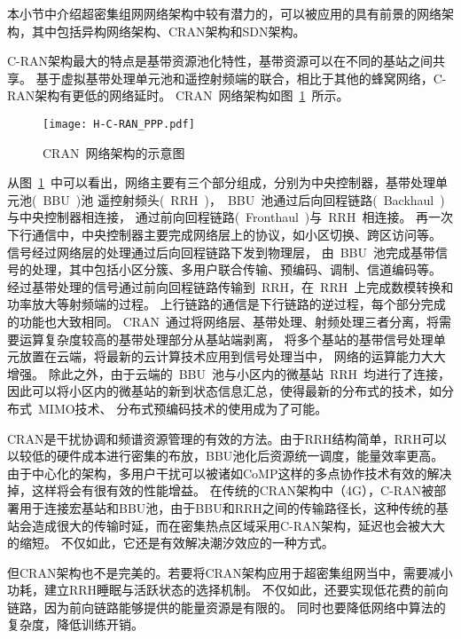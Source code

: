 本小节中介绍超密集组网网络架构中较有潜力的，可以被应用的具有前景的网络架构，其中包括异构网络架构、CRAN架构和SDN架构。

C-RAN架构最大的特点是基带资源池化特性，基带资源可以在不同的基站之间共享。
基于虚拟基带处理单元池和遥控射频端的联合，相比于其他的蜂窝网络，C-RAN架构有更低的网络延时。
CRAN~网络架构如图~\ref{CRAN}~所示。
\begin{figure}[htbp]
\centering
\texttt{[image: H-C-RAN\_PPP.pdf]}
\caption{CRAN~网络架构的示意图}\vspace{-1.5em}
\label{CRAN}
\end{figure}
从图~\ref{CRAN}~中可以看出，网络主要有三个部分组成，分别为中央控制器，基带处理单元池(~BBU~)池
遥控射频头(~RRH~)，~BBU~池通过后向回程链路(~Backhaul~)与中央控制器相连接，
通过前向回程链路(~Fronthaul~)与~RRH~相连接。
再一次下行通信中，中央控制器主要完成网络层上的协议，如小区切换、跨区访问等。
信号经过网络层的处理通过后向回程链路下发到物理层，
由~BBU~池完成基带信号的处理，其中包括小区分簇、多用户联合传输、预编码、调制、信道编码等。
经过基带处理的信号通过前向回程链路传输到~RRH，在~RRH~上完成数模转换和功率放大等射频端的过程。
上行链路的通信是下行链路的逆过程，每个部分完成的功能也大致相同。
CRAN~通过将网络层、基带处理、射频处理三者分离，将需要运算复杂度较高的基带处理部分从基站端剥离，
将多个基站的基带信号处理单元放置在云端，将最新的云计算技术应用到信号处理当中，
网络的运算能力大大增强。
除此之外，由于云端的~BBU~池与小区内的微基站~RRH~均进行了连接，
因此可以将小区内的微基站的新到状态信息汇总，使得最新的分布式的技术，如分布式~MIMO技术、
分布式预编码技术的使用成为了可能。

CRAN是干扰协调和频谱资源管理的有效的方法。由于RRH结构简单，RRH可以以较低的硬件成本进行密集的布放，BBU池化后资源统一调度，能量效率更高。
由于中心化的架构，多用户干扰可以被诸如CoMP这样的多点协作技术有效的解决掉，这样将会有很有效的性能增益。
在传统的CRAN架构中（4G），C-RAN被部署用于连接宏基站和BBU池，由于BBU和RRH之间的传输路径长，这种传统的基站会造成很大的传输时延，而在密集热点区域采用C-RAN架构，延迟也会被大大的缩短。
不仅如此，它还是有效解决潮汐效应的一种方式。

但CRAN架构也不是完美的。若要将CRAN架构应用于超密集组网当中，需要减小功耗，建立RRH睡眠与活跃状态的选择机制。
不仅如此，还要实现低花费的前向链路，因为前向链路能够提供的能量资源是有限的。
同时也要降低网络中算法的复杂度，降低训练开销。

